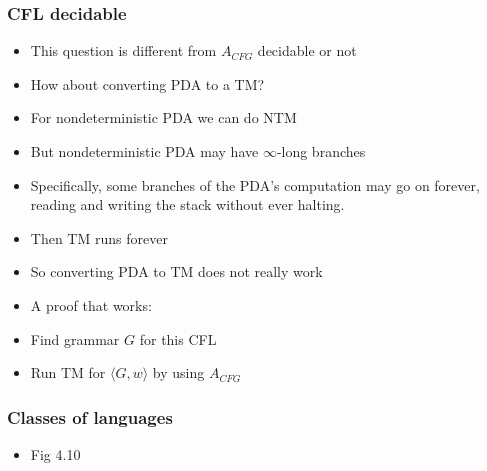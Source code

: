 \begin{frame}[allowframebreaks] \frametitle{CFL decidable}
  \begin{itemize}
\item This question is different from $A_{CFG}$ decidable
or not
\item How about converting PDA to a TM?
\item For nondeterministic PDA we can do NTM 
\item But nondeterministic PDA may have $\infty$-long branches

\item Specifically,  some
branches of the PDA's computation may go on forever, reading and writing the
stack without ever halting.
\item Then TM runs forever
\item So converting PDA to TM does not really work
\item A proof that works:

\item [] Find grammar $G$ for this CFL
\item [] Run TM for $\langle  G,w\rangle $ by using 
$A_{CFG}$
\end{itemize}\end{frame}

\begin{frame}[allowframebreaks] \frametitle{Classes of languages}
  \begin{itemize}
  \item Fig 4.10

\begin{center}
    \end{center}
  \end{itemize}\end{frame}



